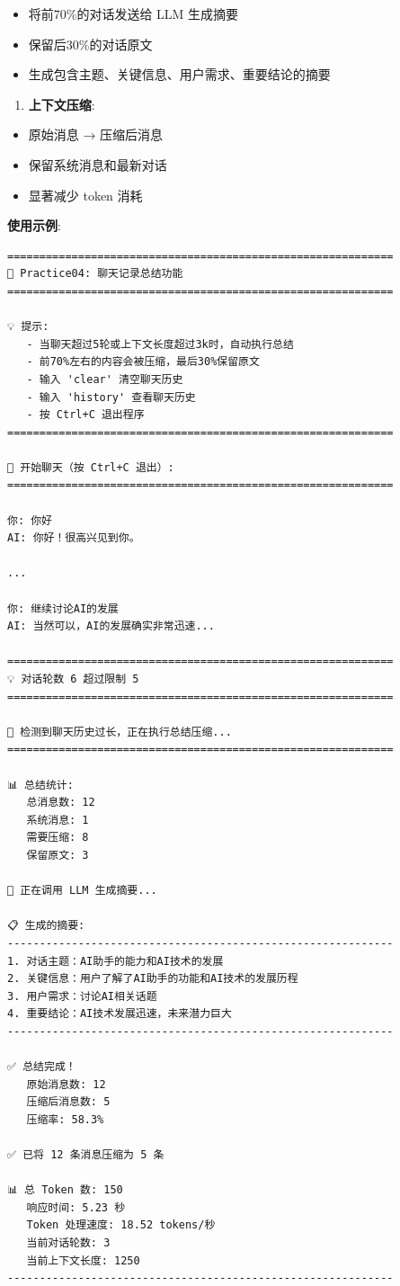 \documentclass[]{article}
\providecommand{\tightlist}{%
  \setlength{\itemsep}{0pt}\setlength{\parskip}{0pt}}
\begin{document}
\begin{itemize}
\tightlist
\item
  将前70\%的对话发送给 LLM 生成摘要
\item
  保留后30\%的对话原文
\item
  生成包含主题、关键信息、用户需求、重要结论的摘要
\end{itemize}

\begin{enumerate}
\def\labelenumi{\arabic{enumi}.}
\setcounter{enumi}{2}
\tightlist
\item
  \textbf{上下文压缩}:
\end{enumerate}

\begin{itemize}
\tightlist
\item
  原始消息 → 压缩后消息
\item
  保留系统消息和最新对话
\item
  显著减少 token 消耗
\end{itemize}

\textbf{使用示例}:

\begin{verbatim}
============================================================
🚀 Practice04: 聊天记录总结功能
============================================================

💡 提示:
   - 当聊天超过5轮或上下文长度超过3k时，自动执行总结
   - 前70%左右的内容会被压缩，最后30%保留原文
   - 输入 'clear' 清空聊天历史
   - 输入 'history' 查看聊天历史
   - 按 Ctrl+C 退出程序
============================================================

💬 开始聊天（按 Ctrl+C 退出）:
============================================================

你: 你好
AI: 你好！很高兴见到你。

...

你: 继续讨论AI的发展
AI: 当然可以，AI的发展确实非常迅速...

============================================================
💡 对话轮数 6 超过限制 5
============================================================

📝 检测到聊天历史过长，正在执行总结压缩...
============================================================

📊 总结统计:
   总消息数: 12
   系统消息: 1
   需要压缩: 8
   保留原文: 3

🤖 正在调用 LLM 生成摘要...

📋 生成的摘要:
------------------------------------------------------------
1. 对话主题：AI助手的能力和AI技术的发展
2. 关键信息：用户了解了AI助手的功能和AI技术的发展历程
3. 用户需求：讨论AI相关话题
4. 重要结论：AI技术发展迅速，未来潜力巨大
------------------------------------------------------------

✅ 总结完成！
   原始消息数: 12
   压缩后消息数: 5
   压缩率: 58.3%

✅ 已将 12 条消息压缩为 5 条

📊 总 Token 数: 150
   响应时间: 5.23 秒
   Token 处理速度: 18.52 tokens/秒
   当前对话轮数: 3
   当前上下文长度: 1250
------------------------------------------------------------
\end{verbatim}
\end{document}

